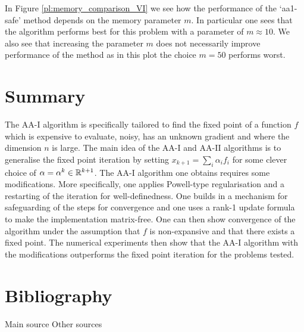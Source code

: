 In Figure \ref{pl:memory_comparison_VI}  we see how the performance of the `aa1-safe' method depends on the memory parameter $m$. In particular one sees that the algorithm performs best for this problem with a parameter of $m\approx10$. We also see that increasing the parameter $m$ does not necessarily improve performance of the method as in this plot the choice $m=50$ performs worst.

\newpage

\section{Summary}

The AA-I algorithm is specifically tailored to find the fixed point of a function $f$ which is expensive to evaluate, noisy, has an unknown gradient and where the dimension $n$ is large. The main idea of the AA-I and AA-II algorithms is to generalise the fixed point iteration by setting $x_{k+1}=\sum_i\alpha_if_i$ for some clever choice of $\alpha=\alpha^k\in\mathbb{R}^{k+1}$. The AA-I algorithm one obtains requires some modifications. More specifically, one applies Powell-type regularisation and a restarting of the iteration for well-definedness. One builds in a mechanism for safeguarding of the steps for convergence and one uses a rank-1 update formula to make the implementation matrix-free. One can then show convergence of the algorithm under the assumption that $f$ is non-expansive and that there exists a fixed point. The numerical experiments then show that the AA-I algorithm with the modifications outperforms the fixed point iteration for the problems tested.



\section*{Bibliography}
\nocite{*}
Main source
\printbibliography[heading=none, keyword={main}]
\noindent Other sources
\printbibliography[heading=none, keyword={secondary}]


